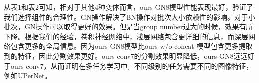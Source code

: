 从表1和表2可知，相对于其他4种变体而言，ours-GN8模型性能表现最好，验证了我们选择组件的合理性。GN操作解决了BN操作对批次大小依赖性的影响。对于小批次，GN操作可以取得更好的效果。但是当group number过大的时候，效果有所下降。根据我们的经验，卷积神经网络中，浅层网络包含更详细的信息，而深层网络包含更多的全局信息。因为ours-GN8模型比ours-w/o-concat 模型包含更多提取到的特征，因此分割效果更好。ours-conv7的分割效果明显降低，ours-GN8远远好于ours-conv7，从而证明在多任务学习中，不同级别的任务需要不同的图像特征，例如UPerNet。

\begin{figure}[h]
\centering
{}
\end{figure}
